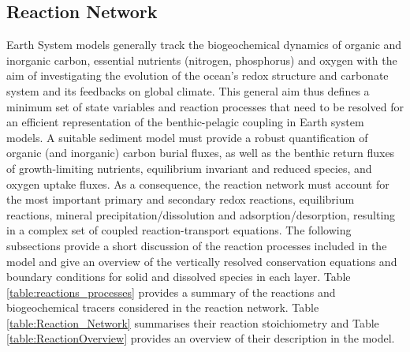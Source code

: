 \documentclass[gmd, manuscript]{copernicus}
\begin{document}
\subsection{Reaction Network}\label{subsec:ReactionNetwork}
Earth System models generally track the biogeochemical dynamics of organic and inorganic carbon, essential nutrients (nitrogen, phosphorus) and oxygen with the aim of investigating the evolution 
of the ocean's redox structure and carbonate system and its feedbacks on global climate. This general aim thus defines a minimum set of state variables and reaction processes that need to be resolved for an efficient 
representation of the benthic-pelagic coupling in Earth system models. A suitable sediment model must provide a robust quantification of organic (and inorganic) carbon burial fluxes, as well as 
the benthic return fluxes of growth-limiting nutrients, equilibrium invariant and reduced species, and oxygen uptake fluxes. 
As a consequence, the reaction network must account for the most important primary and secondary redox reactions, equilibrium reactions, 
mineral precipitation/dissolution and adsorption/desorption, resulting in a complex set of coupled reaction-transport equations. The following 
subsections provide a short discussion of the reaction processes included in the model and give an overview of the 
vertically resolved conservation equations and boundary conditions for solid and dissolved species in each layer. 
Table \ref{table:reactions_processes} provides a summary of the reactions and biogeochemical tracers considered in the reaction network. Table \ref{table:Reaction_Network} summarises their reaction stoichiometry 
and Table \ref{table:ReactionOverview} provides an overview of their description in the model.
\end{document}
